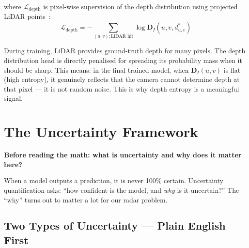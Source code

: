 \documentclass[12pt, a4paper]{article}
\newcommand{\DI}{\mathbf{D}_{I}}
\theoremstyle{definition}
\begin{document}
where $\mathcal{L}_\mathrm{depth}$ is pixel-wise supervision of the depth
distribution using projected LiDAR points~\cite{li2023bevdepth}:
\begin{equation}
  \mathcal{L}_\mathrm{depth}
  = -\sum_{(u,v):\text{LiDAR hit}}
    \log\DI\!\left(u,v,d^*_{u,v}\right)
  \label{eq:depth_sup_loss}
\end{equation}

\begin{plainbox}
During training, LiDAR provides ground-truth depth for many pixels.
The depth distribution head is directly penalised for spreading its probability
mass when it should be sharp.
This means: in the final trained model, when $\DI(u,v)$ is flat (high entropy),
it genuinely reflects that the camera cannot determine depth at that pixel ---
it is not random noise. This is why depth entropy is a meaningful signal.
\end{plainbox}

\section{The Uncertainty Framework}
\label{sec:uncertainty}

\begin{plainbox}
\textbf{Before reading the math: what is uncertainty and why does it matter here?}

When a model outputs a prediction, it is never 100\% certain.
Uncertainty quantification asks: ``how confident is the model, and \emph{why}
is it uncertain?'' The ``why'' turns out to matter a lot for our radar problem.
\end{plainbox}

\subsection{Two Types of Uncertainty --- Plain English First}
\end{document}
